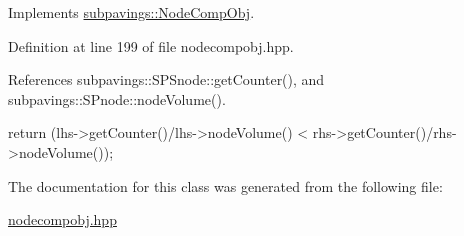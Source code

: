 \-Implements \hyperlink{classsubpavings_1_1NodeCompObj_a121d53049c5ed1c0924313951d6aa630}{subpavings\-::\-Node\-Comp\-Obj}.



\-Definition at line 199 of file nodecompobj.\-hpp.



\-References subpavings\-::\-S\-P\-Snode\-::get\-Counter(), and subpavings\-::\-S\-Pnode\-::node\-Volume().


\begin{DoxyCode}
        { return (lhs->getCounter()/lhs->nodeVolume() 
          < rhs->getCounter()/rhs->nodeVolume()); }
\end{DoxyCode}


\-The documentation for this class was generated from the following file\-:\begin{DoxyCompactItemize}
\item 
\hyperlink{nodecompobj_8hpp}{nodecompobj.\-hpp}\end{DoxyCompactItemize}
